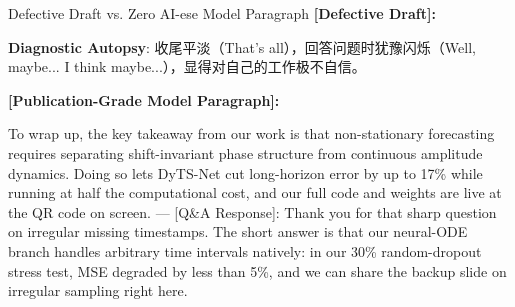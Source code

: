 \begin{ExampleBox}{Defective Draft vs. Zero AI-ese Model Paragraph}
\textbf{\color{TargetHighlight}[Defective Draft]:}\par
{}\par\vspace{4pt}
\textbf{Diagnostic Autopsy}: 收尾平淡（That's all），回答问题时犹豫闪烁（Well, maybe... I think maybe...），显得对自己的工作极不自信。\par\vspace{6pt}
\textbf{\color{AcadNavy}[Publication-Grade Model Paragraph]:}\par
To wrap up, the key takeaway from our work is that non-stationary forecasting requires separating shift-invariant phase structure from continuous amplitude dynamics. Doing so lets DyTS-Net cut long-horizon error by up to 17\% while running at half the computational cost, and our full code and weights are live at the QR code on screen. --- [Q\&A Response]: Thank you for that sharp question on irregular missing timestamps. The short answer is that our neural-ODE branch handles arbitrary time intervals natively: in our 30\% random-dropout stress test, MSE degraded by less than 5\%, and we can share the backup slide on irregular sampling right here.
\end{ExampleBox}
